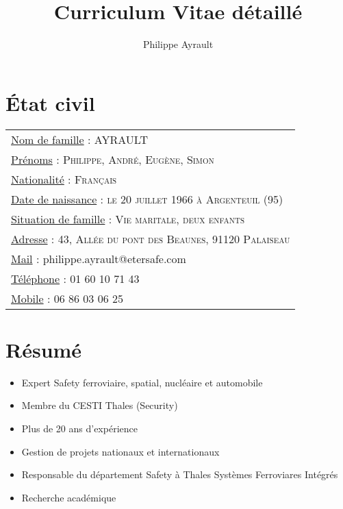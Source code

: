 \documentclass[a4paper,12pt]{article}
\title{Curriculum Vitae d\'etaill\'e}
\author{Philippe  Ayrault}
\begin{document}


\maketitle


\section{\'Etat civil}
\begin{tabular}{l}
\underline{Nom de famille} : \textsc{AYRAULT} \\
\underline{Pr\'enoms} : \textsc{Philippe, Andr\'e, Eug\`ene, Simon} \\
\underline{Nationalit\'e} : \textsc{Fran\c{c}ais}\\
\underline{Date de naissance} : \textsc{le 20 juillet 1966 \`a
  Argenteuil (95)} \\
\underline{Situation de famille} : \textsc{Vie maritale, deux enfants} \\
\underline{Adresse} : \textsc{43, All\'ee du pont des Beaunes, 91120
  Palaiseau} \\
\underline{Mail} : philippe.ayrault@etersafe.com \\
\underline{T\'el\'ephone} : 01 60 10 71 43 \\
\underline{Mobile} : 06 86 03 06 25 \\

\end{tabular}


\section{R\'esum\'e}


\begin{itemize}
\item Expert Safety ferroviaire, spatial, nucl\'eaire et automobile
\item Membre du CESTI Thales (Security)
\item Plus de 20 ans d'exp\'erience
\item Gestion de projets nationaux et internationaux
\item Responsable du d\'epartement Safety \`a Thales Syst\`emes
  Ferroviares Int\'egr\'es
\item Recherche acad\'emique
\end{itemize}
\end{document}
